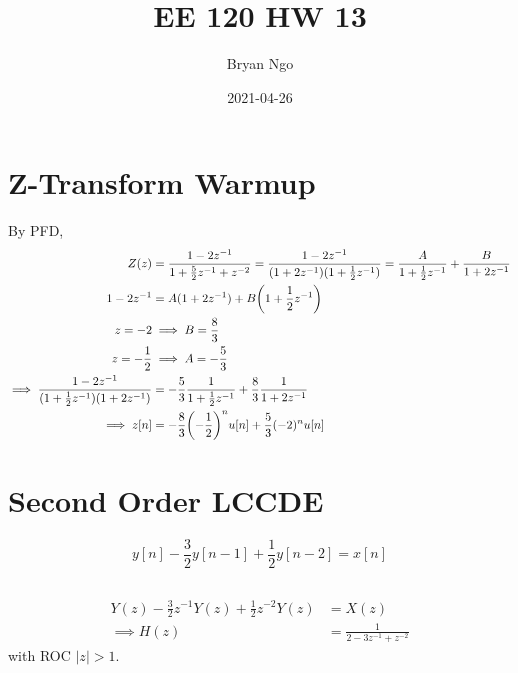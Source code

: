 \documentclass{article}
\title{EE 120 HW 13}
\author{Bryan Ngo}
\date{2021-04-26}
\begin{document}
\maketitle

\section{Z-Transform Warmup}

By PFD,
\begin{align}
    Z(z) &= \frac{1 - 2z^{-1}}{1 + \frac{5}{2} z^{-1} + z^{-2}} = \frac{1 - 2z^{-1}}{(1 + 2z^{-1}) (1 + \frac{1}{2} z^{-1})} = \frac{A}{1 + \frac{1}{2} z^{-1}} + \frac{B}{1 + 2z^{-1}} \\
    1 - 2z^{-1} &= A (1 + 2z^{-1}) + B \qty(1 + \frac{1}{2} z^{-1}) \\
    z = -2 &\implies B = \frac{8}{3} \\
    z = -\frac{1}{2} &\implies A = -\frac{5}{3} \\
    \implies \frac{1 - 2z^{-1}}{(1 + \frac{1}{2} z^{-1}) (1 + 2z^{-1})} &= -\frac{5}{3} \frac{1}{1 + \frac{1}{2} z^{-1}} + \frac{8}{3} \frac{1}{1 + 2z^{-1}} \\
    \implies z[n] &= -\frac{8}{3} \qty(-\frac{1}{2})^n u[n] + \frac{5}{3} (-2)^n u[n]
\end{align}

\section{Second Order LCCDE}

\begin{equation}
    y[n] - \frac{3}{2} y[n - 1] + \frac{1}{2} y[n - 2] = x[n]
\end{equation}

\subsection{}

\begin{align}
    Y(z) - \frac{3}{2} z^{-1} Y(z) + \frac{1}{2} z^{-2} Y(z) &= X(z) \\
    \implies H(z) &= \frac{1}{2 - 3z^{-1} + z^{-2}}
\end{align}
with ROC \(|z| > 1\).

\subsection{}
\end{document}
